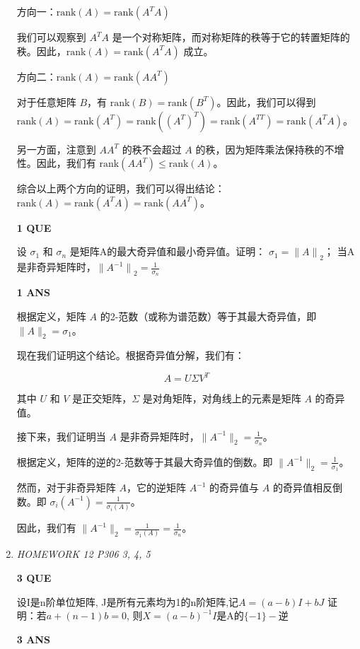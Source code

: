 \documentclass[11pt,letterpaper]{ctexart}
\begin{document}
\begin{enumerate}
方向一：$\text{rank}(A) = \text{rank}(A^TA)$

我们可以观察到 $A^TA$ 是一个对称矩阵，而对称矩阵的秩等于它的转置矩阵的秩。因此，$\text{rank}(A) = \text{rank}(A^TA)$ 成立。

方向二：$\text{rank}(A) = \text{rank}(AA^T)$

对于任意矩阵 $B$，有 $\text{rank}(B) = \text{rank}(B^T)$。因此，我们可以得到 $\text{rank}(A) = \text{rank}(A^T) = \text{rank}((A^T)^T) = \text{rank}(A^{TT}) = \text{rank}(A^TA)$。

另一方面，注意到 $AA^T$ 的秩不会超过 $A$ 的秩，因为矩阵乘法保持秩的不增性。因此，我们有 $\text{rank}(AA^T) \leq \text{rank}(A)$。

综合以上两个方向的证明，我们可以得出结论：$\text{rank}(A) = \text{rank}(A^TA) = \text{rank}(AA^T)$。

\textbf{1 QUE}
\bigskip

设 $\sigma_1$ 和 $\sigma_n$ 是矩阵A的最大奇异值和最小奇异值。证明： $\sigma_1 = {\parallel A \parallel}_2$；
当A是非奇异矩阵时，${\parallel A^{-1} \parallel}_2 = \frac{1}{\sigma_n}$


\textbf{1 ANS}
\bigskip

根据定义，矩阵 $A$ 的2-范数（或称为谱范数）等于其最大奇异值，即 $\|A\|_2 = \sigma_1$。

现在我们证明这个结论。根据奇异值分解，我们有：

$$
A = U\Sigma V^T
$$

其中 $U$ 和 $V$ 是正交矩阵，$\Sigma$ 是对角矩阵，对角线上的元素是矩阵 $A$ 的奇异值。


接下来，我们证明当 $A$ 是非奇异矩阵时，$\|A^{-1}\|_2 = \frac{1}{\sigma_n}$。

根据定义，矩阵的逆的2-范数等于其最大奇异值的倒数。即 $\|A^{-1}\|_2 = \frac{1}{\sigma_1}$。

然而，对于非奇异矩阵 $A$，它的逆矩阵 $A^{-1}$ 的奇异值与 $A$ 的奇异值相反倒数。即 $\sigma_i(A^{-1}) = \frac{1}{\sigma_i(A)}$。

因此，我们有 $\|A^{-1}\|_2 = \frac{1}{\sigma_1(A)} = \frac{1}{\sigma_n}$。


\item \textit{HOMEWORK 12 {P306 3, 4, 5}}%


\textbf{3 QUE}
\bigskip

设I是n阶单位矩阵, J是所有元素均为1的n阶矩阵,记$A = (a - b) I + bJ$  
证明：若$a + (n - 1)b = 0$, 则$X = (a - b)^{-1}I$是A的$\{-1\}-$逆

\textbf{3 ANS}
\bigskip


\end{enumerate}
\end{document}
